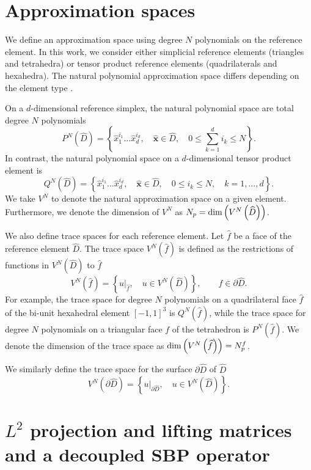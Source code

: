 \documentclass[review]{siamart0216}
\theoremstyle{assumption}
\renewcommand{\hat}[1]{\widehat{#1}}
\newcommand{\LRp}[1]{\left( #1 \right)}
\newcommand{\LRc}[1]{\left\{ #1 \right\}}
\begin{document}
\section{Approximation spaces}

We define an approximation space using degree $N$ polynomials on the reference element.  In this work, we consider either simplicial reference elements (triangles and tetrahedra) or tensor product reference elements (quadrilaterals and hexahedra).  The natural polynomial approximation space differs depending on the element type \cite{chan2015gpu}.  

On a $d$-dimensional reference simplex, the natural polynomial space are total degree $N$ polynomials 
\[
P^N\LRp{\widehat{D}} = \LRc{\hat{x}_1^{i_1}\ldots\hat{x}_d^{i_d}, \quad \hat{\bm{x}} \in \widehat{D}, \quad 0\leq \sum_{k=1}^d i_k \leq N}.
\]
In contrast, the natural polynomial space on a $d$-dimensional tensor product element is 
\[
Q^N\LRp{\widehat{D}} = \LRc{\hat{x}_1^{i_1}\ldots\hat{x}_d^{i_d}, \quad \hat{\bm{x}} \in \widehat{D}, \quad 0\leq i_k \leq N, \quad k = 1,\ldots, d}.
\]
We take $V^N$ to denote the natural approximation space on a given element.  Furthermore, we denote the dimension of $V^N$  as $N_p = {\rm dim}\LRp{V^N\LRp{\widehat{D}}}$.  

We also define trace spaces for each reference element.  Let $\hat{f}$ be a face of the reference element $\hat{D}$.  The trace space $V^N \LRp{\hat{f}}$ is defined as the restrictions of functions in $V^N\LRp{\hat{D}}$ to $\hat{f}$
\[
V^N \LRp{\hat{f}} = \LRc{ \left.u\right|_{\hat{f}}, \quad u \in V^N\LRp{\hat{D}}}, \qquad \hat{f}\in \partial\hat{D}.
\]
For example, the trace space for degree $N$ polynomials on a quadrilateral face $\hat{f}$ of the bi-unit hexahedral element $[-1,1]^3$ is $Q^N\LRp{\hat{f}}$, while the trace space for degree $N$ polynomials on a triangular face $f$ of the tetrahedron is $P^N\LRp{\hat{f}}$.  We denote the dimension of the trace space as ${\rm dim}\LRp{V^N\LRp{{\hat{f}}}} = N^f_p$.  

We similarly define the trace space for the surface $\partial \hat{D}$ of $\hat{D}$
\[
V^N \LRp{\partial \hat{D}} = \LRc{ \left.u\right|_{\partial \hat{D}}, \quad u \in V^N\LRp{\hat{D}}}.
\]



\section{$L^2$ projection and lifting matrices and a decoupled SBP operator}
\end{document}
